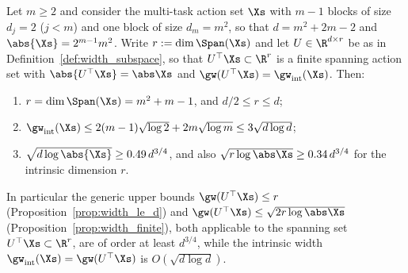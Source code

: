 \begin{theorem}\label{thm:width_separation}
\leanok
{}
Let $m \ge 2$ and consider the multi-task action set $\Xs$ with $m-1$ blocks of size
$d_j = 2$ ($j < m$) and one block of size $d_m = m^2$, so that $d = m^2 + 2m - 2$ and
$\abs{\Xs} = 2^{m-1}m^2$. Write $r := \dim\Span(\Xs)$ and let $U \in \R^{d\times r}$ be as in
Definition~\ref{def:width_subspace}, so that $U^\top\Xs \subset \R^r$ is a finite spanning
action set with $\abs{U^\top\Xs} = \abs\Xs$ and $\gw(U^\top\Xs) = \gw_{\mathrm{int}}(\Xs)$. Then:
\begin{enumerate}
  \item[(i)] $r = \dim\Span(\Xs) = m^2 + m - 1$, and $d/2 \le r \le d$;
  \item[(ii)] $\gw_{\mathrm{int}}(\Xs) \le 2(m-1)\sqrt{\log 2} + 2m\sqrt{\log m} \le 3\sqrt{d\log d}$;
  \item[(iii)] $\sqrt{d\log\abs{\Xs}} \ge 0.49\, d^{3/4}$, and also
        $\sqrt{r\log\abs\Xs} \ge 0.34\,d^{3/4}$ for the intrinsic dimension $r$.
\end{enumerate}
In particular the generic upper bounds $\gw(U^\top\Xs) \le r$
(Proposition~\ref{prop:width_le_d}) and $\gw(U^\top\Xs) \le \sqrt{2r\log\abs\Xs}$
(Proposition~\ref{prop:width_finite}), both applicable to the spanning set
$U^\top\Xs \subset \R^r$, are of order at least $d^{3/4}$, while the intrinsic width
$\gw_{\mathrm{int}}(\Xs) = \gw(U^\top\Xs)$ is $O(\sqrt{d\log d})$.
\end{theorem}

